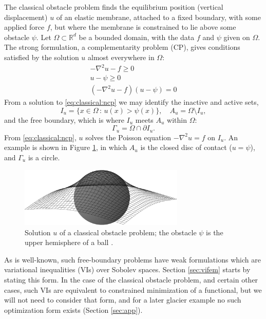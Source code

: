 \documentclass[]{interact}
\theoremstyle{plain}%
\theoremstyle{definition}
\theoremstyle{remark}
\newcommand{\RR}{\mathbb{R}}
\begin{document}
The classical obstacle problem \cite{KinderlehrerStampacchia1980} finds the equilibrium position (vertical displacement) $u$ of an elastic membrane, attached to a fixed boundary, with some applied force $f$, but where the membrane is constrained to lie above some obstacle $\psi$.  Let $\Omega \subset \RR^d$ be a bounded domain, with the data $f$ and $\psi$ given on $\Omega$.  The strong formulation, a complementarity problem (CP), gives conditions satisfied by the solution $u$ almost everywhere in $\Omega$:
\begin{subequations} \label{eq:classical:ncp}
\begin{align}
  -\nabla^2 u - f \geq 0 \\
  u - \psi \geq 0\\
  (-\nabla^2u - f)(u - \psi) = 0
\end{align}
\end{subequations}
From a solution to \eqref{eq:classical:ncp} we may identify the inactive and active sets,
\begin{equation}
  I_u = \{x \in \Omega \,:\, u(x) > \psi(x)\}, \quad A_u = \Omega \setminus I_u, \label{eq:classical:sets}
\end{equation}
and the free boundary, which is where $I_u$ meets $A_u$ within $\Omega$:
\begin{equation}
  \Gamma_u = \Omega \cap \partial I_u. \label{eq:classical:free}
\end{equation}
From \eqref{eq:classical:ncp}, $u$ solves the Poisson equation $-\nabla^2u = f$ on $I_u$.  An example is shown in Figure \ref{fig:ball}, in which $A_u$ is the closed disc of contact ($u=\psi$), and $\Gamma_u$ is a circle.

\begin{figure}[H]
\centering
\includegraphics[width=0.7\textwidth]{static/obstacle65.pdf}
\caption{Solution $u$ of a classical obstacle problem; the obstacle $\psi$ is the upper hemisphere of a ball \cite[used by permission]{Bueler2021}.}
\label{fig:ball}
\end{figure}

As is well-known, such free-boundary problems have weak formulations which are variational inequalities (VIs) over Sobolev spaces.  Section \ref{sec:vifem} starts by stating this form.  In the case of the classical obstacle problem, and certain other cases, such VIs are equivalent to constrained minimization of a functional, but we will not need to consider that form, and for a later glacier example no such optimization form exists (Section \ref{sec:app}).
\end{document}
